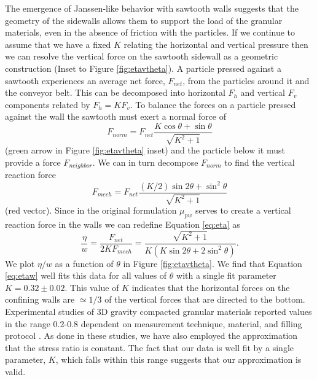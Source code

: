 The emergence of Janssen-like behavior with sawtooth walls suggests that the geometry of the sidewalls allows them to support the load of the granular materials, even in the absence of friction with the particles.  If we continue to assume that we have a fixed $K$ relating the horizontal and vertical pressure then we can resolve the vertical force on the sawtooth sidewall as a geometric construction (Inset to Figure \ref{fig:etavtheta}). A particle pressed against a sawtooth experiences an average net force, $F_{net}$, from the particles around it and the conveyor belt. This can be decomposed into horizontal $F_{h}$ and vertical $F_{v}$ components related by $F_{h}=KF_{v}$.  To balance the forces on a particle pressed against the wall the sawtooth must exert a normal force of 
\begin{equation}
%
F_{norm} =  F_{net}\frac{K\cos\theta+\sin\theta}{\sqrt{K^{2}+1}}
\end{equation}
%
(green arrow in Figure \ref{fig:etavtheta} inset) and the particle below it must provide a force $F_{neighbor}$. We can in turn decompose $F_{norm}$ to find the vertical reaction force
%
\begin{equation}
F_{mech} = F_{net}\frac{(K/2)\sin2\theta +\sin^{2}\theta}{\sqrt{K^{2}+1}}
\end{equation}
%
(red vector). Since in the original formulation $\mu_{pw}$ serves to create a vertical reaction force in the walls we can redefine Equation \ref{eq:eta} as 
%
\begin{equation} 
\frac{\eta}{w}= \frac{F_{net}}{2 K F_{mech}} = \frac{\sqrt{K^{2} +1}}{K(K\sin2\theta +2\sin^2 \theta)}.
\label{eq:etaw}
\end{equation}
%
We plot $\eta/w$ as a function of $\theta$ in Figure \ref{fig:etavtheta}.  We find that Equation \ref{eq:etaw} well fits this data for all values of $\theta$ with a single fit parameter $K = 0.32 \pm0.02$. This value of $K$ indicates that the horizontal forces on the confining walls are $\simeq 1/3$ of the vertical forces that are directed to the bottom.  Experimental studies of 3D gravity compacted granular materials reported values in the range 0.2-0.8 dependent on measurement technique, material, and filling protocol \cite{janssen_versuche_1895, caughey_lateral_1951, sundaram_reassessment_1979, atewologun_experimental_1991, rusinek_experimental_2003}. As done in these studies, we have also employed the approximation that the stress ratio is constant. The fact that our data is well fit by a single parameter, $K$, which falls within this range suggests that our approximation is valid. 

